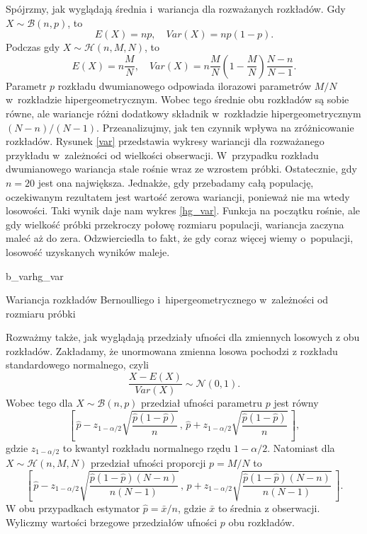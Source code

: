 Spójrzmy, jak wyglądają średnia i~wariancja dla rozważanych rozkładów.
Gdy $X\sim\mathcal{B}(n,p)$, to
\begin{equation}
E(X)=np,\quad Var(X)=np(1-p).
\end{equation}
Podczas gdy $X\sim\mathcal{H}(n,M,N)$, to
\begin{equation}
E(X)=n\frac{M}{N},\quad Var(X)=n\frac{M}{N}\left(1-\frac{M}{N}\right)\frac{N-n}{N-1}.
\end{equation}
Parametr $p$ rozkładu dwumianowego odpowiada ilorazowi parametrów $M/N$ w~rozkładzie hipergeometrycznym. Wobec tego średnie obu rozkładów są sobie równe, ale wariancje różni dodatkowy składnik w~rozkładzie hipergeometrycznym $(N-n)/(N-1)$. Przeanalizujmy, jak ten czynnik wpływa na zróżnicowanie rozkładów. Rysunek \ref{var} przedstawia wykresy wariancji dla rozważanego przykładu w~zależności od wielkości obserwacji. W~przypadku rozkładu dwumianowego wariancja stale rośnie wraz ze wzrostem próbki. Ostatecznie, gdy $n=20$ jest ona największa. Jednakże, gdy przebadamy całą populację, oczekiwanym rezultatem jest wartość zerowa wariancji, ponieważ nie ma wtedy losowości. Taki wynik daje nam wykres \ref{hg_var}. Funkcja na początku rośnie, ale gdy wielkość próbki przekroczy połowę rozmiaru populacji, wariancja zaczyna maleć aż do zera. Odzwierciedla to fakt, że gdy coraz więcej wiemy o~populacji, losowość uzyskanych wyników maleje.

\begin{diagrams}{b_var}{hg_var}
	\caption{Wariancja rozkładów Bernoulliego i~hipergeometrycznego w~zależności od rozmiaru próbki}
	\label{var}
\end{diagrams}

Rozważmy także, jak wyglądają przedziały ufności dla zmiennych losowych z obu rozkładów. Zakładamy, że unormowana zmienna losowa pochodzi z rozkładu standardowego normalnego, czyli
\begin{equation}
\frac{X-E(X)}{Var(X)}\sim \mathcal{N}(0,1).
\end{equation}
Wobec tego dla $X\sim \mathcal{B}(n,p)$ przedział ufności parametru $p$ jest równy
\begin{equation}
\left[\, \hat{p}-z_{1-\alpha/2}\sqrt{\frac{\hat{p}(1-\hat{p})}{n}}\, , \,  \hat{p}+z_{1-\alpha/2}\sqrt{\frac{\hat{p}(1-\hat{p})}{n}}\, \right],
\end{equation}
gdzie $z_{1-\alpha/2}$ to kwantyl rozkładu normalnego rzędu $1-\alpha/2$.
Natomiast dla $X\sim\mathcal{H}(n,M,N)$ przedział ufności proporcji $p=M/N$ to
\begin{equation}
\left[\, \hat{p}-z_{1-\alpha/2} \sqrt{\frac{\hat{p}(1-\hat{p})(N-n)}{n(N-1)}}\, , \, \hat{p} + z_{1-\alpha/2} \sqrt{\frac{\hat{p}(1-\hat{p})(N-n)}{n(N-1)}}\, \right].
\end{equation}
W obu przypadkach estymator $\hat{p}=\bar{x}/n$, gdzie $\bar{x}$ to średnia z obserwacji.
Wyliczmy wartości brzegowe przedziałów ufności $p$ obu rozkładów. 

